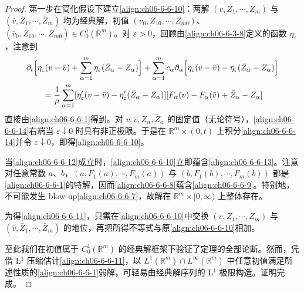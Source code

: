\documentclass[../../main.tex]{subfiles}
\begin{document}
\begin{proof}
第一步在简化假设下建立\eqref{align:ch06-6-6-10}：两解 $(v,Z_{1},\cdots,Z_{m})$ 与 $(\bar{v},\bar{Z}_{1},\cdots,\bar{Z}_{m})$ 均为经典解，初值 $(v_{0},Z_{10},\cdots,Z_{m0})$、$(\bar{v}_{0},\bar{Z}_{10},\cdots,\bar{Z}_{m0})\in C_{0}^{1}(\mathbb{R}^{m})$。对 $\varepsilon>0$，回顾由\eqref{align:ch06-6-3-8}定义的函数 $\eta_{\varepsilon}$，注意到
\begin{align}
&\partial_{t}\Bigl{[}\eta_{\varepsilon}(v-\bar{v})+\sum_{\alpha=1}^{m}\eta_{\varepsilon}(\bar{Z}_{\alpha}-Z_{\alpha})\Bigr{]}+\sum_{\alpha=1}^{m}c_{\alpha}\partial_{\alpha}\Bigl{[}\eta_{\varepsilon}(v-\bar{v})-\eta_{\varepsilon}(\bar{Z}_{\alpha}-Z_{\alpha})\Bigr{]}\notag\\
&\qquad=\frac{1}{\mu}\sum_{\alpha=1}^{m}[\eta_{\varepsilon}^{\prime}(v-\bar{v})-\eta_{\varepsilon}^{\prime}(\bar{Z}_{\alpha}-Z_{\alpha})][F_{\alpha}(v)-F_{\alpha}(\bar{v})+\bar{Z}_{\alpha}-Z_{\alpha}]
\label{align:ch06-6-6-14}
\end{align}
直接由\eqref{align:ch06-6-6-1}得到。对 $v,\bar{v},Z_{\alpha},\bar{Z}_{\alpha}$ 的固定值（无论符号），\eqref{align:ch06-6-6-14}右端当 $\varepsilon\downarrow 0$ 时具有非正极限。于是在 $\mathbb{R}^{m}\times(0,t)$ 上积分\eqref{align:ch06-6-6-14}并令 $\varepsilon\downarrow 0$，即得\eqref{align:ch06-6-6-10}。

当\eqref{align:ch06-6-6-12}成立时，\eqref{align:ch06-6-6-10}立即蕴含\eqref{align:ch06-6-6-13}。注意对任意常数 $a$、$b$，$(a,F_{1}(a),\cdots,F_{m}(a))$ 与 $(b,F_{1}(b),\cdots,F_{m}(b))$ 都是\eqref{align:ch06-6-6-1}的特解，因而\eqref{align:ch06-6-6-8}蕴含\eqref{align:ch06-6-6-9}。特别地，不可能发生 blow-up\eqref{align:ch06-6-6-7}，故解在 $\mathbb{R}^{m}\times[0,\infty)$ 上整体存在。

为得\eqref{align:ch06-6-6-11}，只需在\eqref{align:ch06-6-6-10}中交换 $(v,Z_{1},\cdots,Z_{m})$ 与 $(\bar{v},\bar{Z}_{1},\cdots,\bar{Z}_{m})$ 的地位，再把所得不等式与原\eqref{align:ch06-6-6-10}相加。

至此我们在初值属于 $C_{0}^{1}(\mathbb{R}^{m})$ 的经典解框架下验证了定理的全部论断。然而，凭借 L$^{1}$ 压缩估计\eqref{align:ch06-6-6-11}，以 $L^{1}(\mathbb{R}^{m})\cap L^{\infty}(\mathbb{R}^{m})$ 中任意初值满足所述性质的\eqref{align:ch06-6-6-1}弱解，可轻易由经典解序列的 L$^{1}$ 极限构造。证明完成。
\end{proof}
\end{document}
